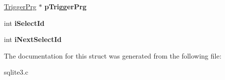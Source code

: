 \begin{DoxyCompactItemize}
\item 
\hypertarget{struct_parse_a0891dbd3b583594c5d07d7b061026ea4}{\hyperlink{struct_trigger_prg}{Trigger\-Prg} $\ast$ {\bfseries p\-Trigger\-Prg}}\label{struct_parse_a0891dbd3b583594c5d07d7b061026ea4}

\item 
\hypertarget{struct_parse_a7474fa0bf9ad160cbdf723406c306d9d}{int {\bfseries i\-Select\-Id}}\label{struct_parse_a7474fa0bf9ad160cbdf723406c306d9d}

\item 
\hypertarget{struct_parse_aab76240bd43c005941431179d4f9bf49}{int {\bfseries i\-Next\-Select\-Id}}\label{struct_parse_aab76240bd43c005941431179d4f9bf49}

\end{DoxyCompactItemize}


The documentation for this struct was generated from the following file\-:\begin{DoxyCompactItemize}
\item 
sqlite3.\-c\end{DoxyCompactItemize}
